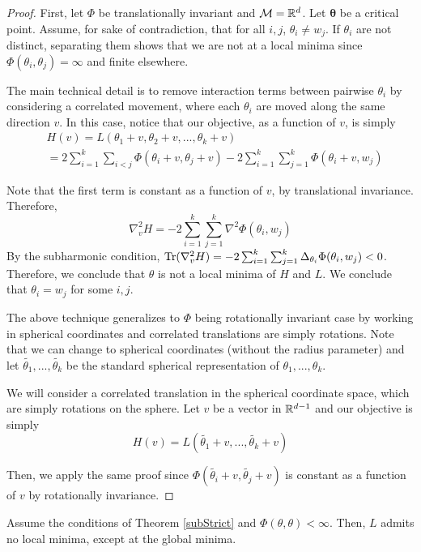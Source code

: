\begin{proof}
First, let $\Phi$ be translationally invariant and $\mathcal{M} =
{\mathbb{R}}^d$. Let $\boldsymbol{\theta}$ be a critical point. Assume, for sake
of contradiction, that for all $i, j$, $\theta_i \neq w_j$. If
$\theta_i$ are not distinct, separating them shows that
we are not at a local minima since $\Phi(\theta_i,\theta_j) = \infty$
and finite elsewhere. 

The main technical detail is to remove interaction terms between
pairwise $\theta_i$ by considering a correlated movement, where each
$\theta_i$ are moved along the same direction $v$. In this case,
notice that our objective, as a function of $v$, is simply
\begin{align*}
& H(v) = L(\theta_1+ v, \theta_2 + v, ...,\theta_k + v) \\
& =  2\sum_{i=1}^k\sum_{i < j} \Phi(\theta_i+v,\theta_j+v) -
  2\sum_{i=1}^k\sum_{j=1}^k \Phi(\theta_i+v,w_j)
\end{align*}

Note that the first term is constant as a function of $v$, by
translational invariance. Therefore,
\[\nabla_{v}^2 H = -2\sum_{i=1}^k \sum_{j=1}^k \nabla^2\Phi(\theta_i, w_j)\]
By the subharmonic condition,
$\operatorname{Tr}(\nabla_{v}^2H) = -2\sum_{i=1}^k\sum_{j=1}^k
\Delta_{\theta_i}\Phi(\theta_i,w_j) < 0$.
Therefore, we conclude that $\theta$ is not a local minima of $H$ and
$L$.  We conclude that $\theta_i = w_j$ for some $i, j$.

The above technique generalizes to $\Phi$ being rotationally invariant case by
working in spherical coordinates and correlated translations are
simply rotations. Note that we can change to spherical coordinates (without the radius parameter) and let $\widetilde{\theta_1},...,\widetilde{\theta_{k}}$ be the standard spherical representation of $\theta_1,...,\theta_k$. 

We will consider a correlated translation in the spherical coordinate space, which are simply rotations on the sphere. Let $v$ be a vector in ${\mathbb{R}}^{d-1}$ and our objective is simply
\[ H(v) = L( \widetilde{\theta_1}+v,...,\widetilde{\theta_{k}} +v)\]

Then, we apply the same proof since $\Phi( \widetilde{\theta_i}+v, \widetilde{\theta_j}+v)$ is constant as a function of $v$ by rotationally invariance.
\end{proof}
%
\begin{corollary}
Assume the conditions of Theorem \ref{subStrict} and $\Phi(\theta,\theta) < \infty$. Then, $L$ admits no local minima, except at the global minima.
\end{corollary} 

